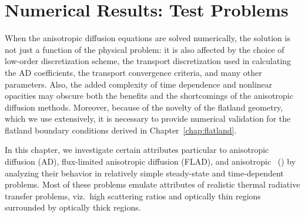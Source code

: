 
\chapter{Numerical Results: Test Problems}\label{chap:simpleNumericalResults}

When the anisotropic diffusion equations are solved numerically, the solution
is not just a function of the physical problem: it is also affected by the
choice
of low-order discretization scheme, the transport discretization used in
calculating the AD coefficients, the transport convergence criteria, and many
other parameters. Also, the added complexity of time dependence and
nonlinear opacities may obscure both the benefits and the shortcomings of the
anisotropic diffusion methods. Moreover, because of the novelty of the
flatland geometry, which we use extensively, it is necessary to provide
numerical validation for the flatland boundary conditions derived in
Chapter~\ref{chap:flatland}.

In this chapter, we investigate certain attributes particular to
anisotropic diffusion (AD), flux-limited anisotropic diffusion (FLAD), and
anisotropic \Pone\ (\APone) by analyzing their behavior in relatively simple
steady-state
and time-dependent problems. Most of these problems emulate attributes of
realistic thermal radiative transfer problems, viz.~high scattering ratios and
optically thin regions surrounded by optically thick regions.

